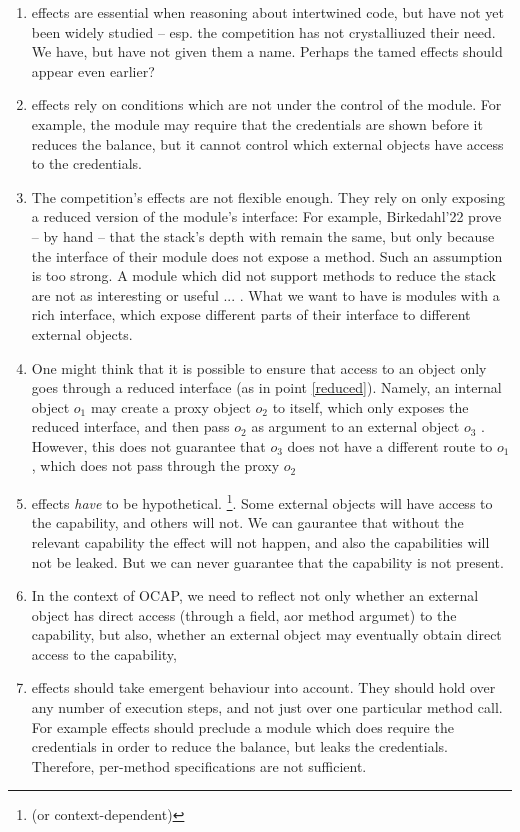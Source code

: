  \vspace{.8cm}
 \begin{enumerate}
 \item
 \Tamed effects are essential when reasoning about intertwined code, but have not yet been widely studied -- esp. the competition has not crystalliuzed their need. We have, but have not given them a name. Perhaps the tamed effects should appear even earlier?
 \item
\Tamed effects rely on conditions which are not under the control of the module. 
For example, the module may require that the credentials are shown before it reduces the balance, but it cannot control which external objects have access to the credentials. 
\item
\label{reduced}
The competition's effects  are not flexible enough. 
They rely on only exposing a reduced version of the module's interface:
For example, Birkedahl'22   prove -- by  hand -- that the stack's depth with remain the same, but only because the interface of their module does not expose a  method. 
Such an assumption is too strong. 
A module which did not support methods to reduce the stack are not as interesting or useful ... .
What we want to have is modules with a rich interface, which expose different parts  of their interface to different external objects.
\item
One might think that it is possible to ensure that access to an object only goes through a reduced interface (as in point  \ref{reduced}).
Namely, an internal object $o_1$ may create a proxy object $o_2$ to itself, which only exposes the reduced interface, and then pass $o_2$ as  argument to an external object $o_3$ .
However, this does not guarantee that $o_3$ does not have a different route to $o_1$, which does not pass through the proxy $o_2$
\item
\Tamed effects \emph{have} to be hypothetical. \footnote{ (or context-dependent)}.  
Some external objects will have access to the capability, and others will not. 
We can gaurantee that without the relevant capability the effect will not happen, and also the capabilities will not be leaked. 
But we can never guarantee that the capability is not present.
\item
In the context of OCAP, we need to reflect not only whether an external object has direct access (through a field, aor method  argumet) to the capability, but also, whether an external object may eventually obtain  direct access to the capability,
\item
\Tamed effects should take emergent behaviour into account. 
They should hold over any number of execution steps, and not just over one particular method call. 
For example \tamed effects should preclude  a module which does require the credentials in order to reduce the balance, but leaks the credentials. Therefore, per-method specifications are not sufficient.
\end{enumerate}

